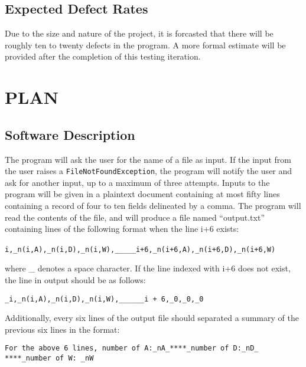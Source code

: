 \documentclass[]{article}
\begin{document}
\subsection{Expected Defect Rates}
\label{sub:references}
Due to the size and nature of the project, it is forcasted that there will be
roughly ten to twenty defects in the program.  A more formal estimate will be
provided after the completion of this testing iteration.



\section{PLAN}
\label{sec:overall_description}

\subsection{Software Description}
\label{sub:product_perspective}
The program will ask the user for the name of a file as input.  If the input
from the user raises  a \verb!FileNotFoundException!, the program will notify
the user and ask for another input, up to a maximum of three attempts. Inputs to the
program will be given in a plaintext document containing at most fifty lines containing a record of four to ten fields delineated by a comma.
The program will read the contents of the file, and will produce a file named
``output.txt'' containing lines of the following format when the line i+6
exists:
\begin{center}
\verb!i,_n(i,A),_n(i,D),_n(i,W),_____i+6,_n(i+6,A),_n(i+6,D),_n(i+6,W)!\
\end{center}
where \_ denotes a space character.  If the line indexed with i+6 does not
exist, the line in output should be as follows:
\begin{center}
\verb!_i,_n(i,A),_n(i,D),_n(i,W),______i + 6,_0,_0,_0!
\end{center}
Additionally, every six lines of the output file should separated a summary of
the previous six lines in the format:
\begin{center}
\verb!For the above 6 lines, number of A:_nA_****_number of D:_nD_!
\verb!****_number of W: _nW!
\end{center}
\end{document}
